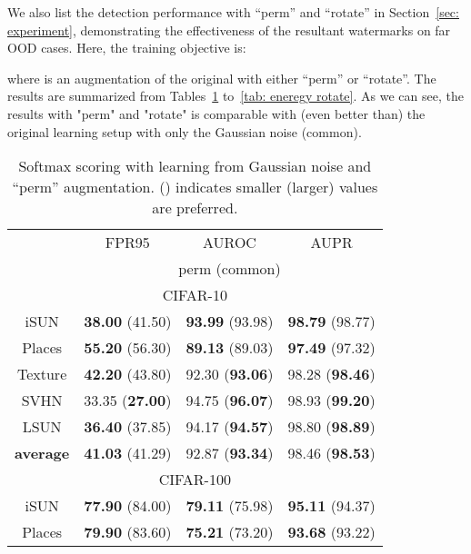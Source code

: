 \documentclass{article}
\begin{document}
{We also list the detection performance with ``perm'' and ``rotate'' in Section~\ref{sec: experiment}, demonstrating the effectiveness of the resultant watermarks on far OOD cases. Here, the training objective is:}

{where  is an augmentation of the original  with either ``perm'' or ``rotate''. The results are summarized from Tables~\ref{tab: softmax perm} to~\ref{tab: eneregy rotate}. As we can see, the results with "perm" and "rotate" is comparable with (even better than) the original learning setup with only the Gaussian noise (common). }

\begin{table}[t]
\parbox{.47\linewidth}{
\centering
\caption{{Softmax scoring with learning from Gaussian noise and ``perm'' augmentation.  () indicates smaller (larger) values are preferred.}} \label{tab: softmax perm}
\vspace{5pt}
\scriptsize
{
\begin{tabular}{c|ccc}
\toprule[1.5pt]
                   & FPR95      & AUROC        & AUPR       \\
                   \cline{2-4} 
\multirow{-2}{*}{} & \multicolumn{3}{c}{perm (common)} \\
\midrule[0.6pt]
\multicolumn{4}{c}{\cellcolor{greyL}CIFAR-10} \\
\midrule[0.6pt]
iSUN               & \textbf{38.00} (41.50) & \textbf{93.99} (93.98) & \textbf{98.79} (98.77) \\ 
Places        & \textbf{55.20} (56.30) & \textbf{89.13} (89.03) & \textbf{97.49} (97.32) \\
Texture            & \textbf{42.20} (43.80) & 92.30 (\textbf{93.06}) & 98.28 (\textbf{98.46}) \\
SVHN               & 33.35 (\textbf{27.00}) & 94.75 (\textbf{96.07}) & {98.93} (\textbf{99.20}) \\
LSUN               & \textbf{36.40} (37.85) & 94.17 (\textbf{94.57}) & 98.80 (\textbf{98.89}) \\
\midrule
\textbf{average}   & \textbf{41.03} (41.29) & {92.87} (\textbf{93.34}) & {98.46} (\textbf{98.53}) \\ \midrule[1pt]
\multicolumn{4}{c}{\cellcolor{greyL}CIFAR-100} \\
\midrule[1pt]
iSUN               & \textbf{77.90} (84.00) & \textbf{79.11} (75.98) & \textbf{95.11} (94.37) \\ 
Places        & \textbf{79.90} (83.60) & \textbf{75.21} (73.20) & \textbf{93.68} (93.22) \\

\end{tabular}}}
\end{table}
\end{document}

